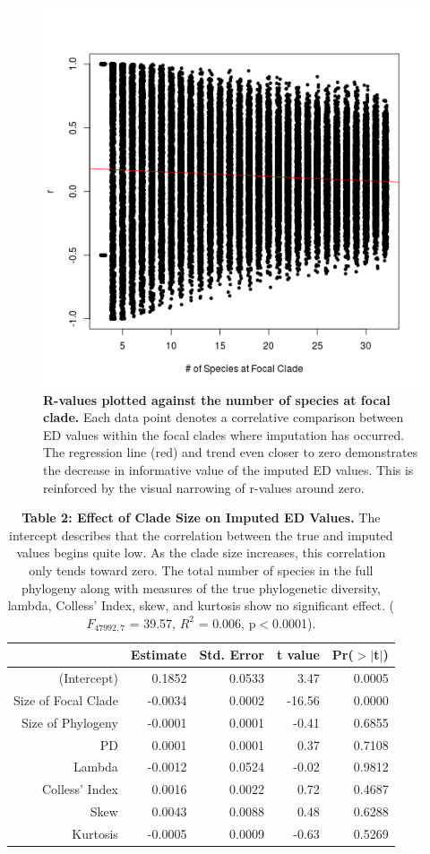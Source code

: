 \documentclass[12pt,english]{article}
\begin{document}
\begin{figure}[!ht]
  \center
  \includegraphics[width=.5\textwidth]{edModel.png}
  \caption{\textbf{R-values plotted against the number of species at focal clade.} 
  Each data point denotes a correlative comparison between ED values within the focal 
  clades where imputation has occurred. The regression line (red) and trend even closer to zero 
  demonstrates the decrease in informative value of the imputed ED values. This is reinforced 
  by the visual narrowing of r-values around zero.}
  \label{imputationTrend}
\end{figure}

\begin{table}[ht] 
\centering
\begin{tabular}{rrrrr}
  \hline
  & Estimate & Std. Error & t value & Pr($>$$|$t$|$) \\
   \hline
 (Intercept) & 0.1852 & 0.0533 & 3.47 & 0.0005 \\
   Size of Focal Clade & -0.0034 & 0.0002 & -16.56 & 0.0000 \\
   Size of Phylogeny & -0.0001 & 0.0001 & -0.41 & 0.6855 \\
   PD & 0.0001 & 0.0001 & 0.37 & 0.7108 \\
   Lambda & -0.0012 & 0.0524 & -0.02 & 0.9812 \\
   Colless' Index & 0.0016 & 0.0022 & 0.72 & 0.4687 \\
   Skew & 0.0043 & 0.0088 & 0.48 & 0.6288 \\
   Kurtosis & -0.0005 & 0.0009 & -0.63 & 0.5269 \\
   \hline
   \hline
\end{tabular}
\caption*{\textbf{Table 2: Effect of Clade Size on Imputed ED Values.} The 
intercept describes that the correlation between the true and imputed values 
begins quite low. As the clade size increases, this correlation only tends
toward zero. The total number of species in the full phylogeny along with 
measures of the true phylogenetic diversity, lambda, Colless' Index, skew, and kurtosis
show no significant effect. ($F_{47992, 7}$ = 39.57, $R^{2}$ = 0.006, p$<$0.0001).}
\end{table}
\end{document}
